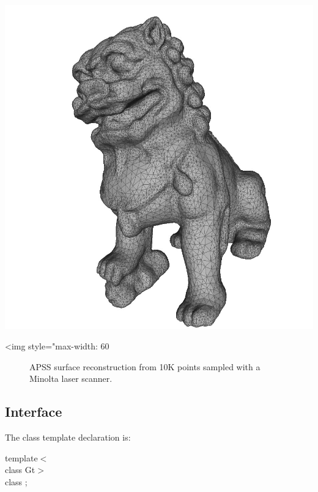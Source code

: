 \begin{center}
    \begin{ccTexOnly}
        \includegraphics[width=1.0\textwidth]{Surface_reconstruction_points_3/APSS} %
    \end{ccTexOnly}
    \begin{ccHtmlOnly}
        <img style="max-width: 60%
    \end{ccHtmlOnly}
    \begin{figure}[h]
        \caption{APSS surface reconstruction from 10K
                 points sampled with a Minolta laser scanner.}
        \label{Surface_reconstruction_points_3-fig-APSS}
    \end{figure}
\end{center}

\subsection{Interface}

The class template declaration is:

template$<$  \\
class Gt$>$   \\
class ;

